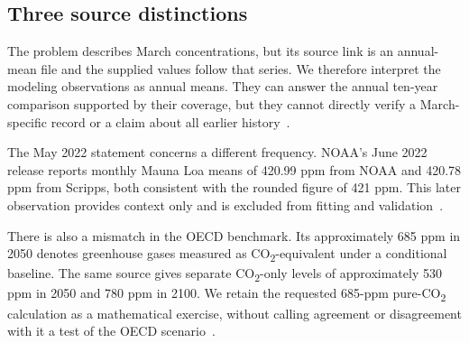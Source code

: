 \documentclass[11pt,a4paper]{article}
\newcommand{\p}[2]{#2\par}
\newcommand{\CO}{CO\textsubscript{2}}
\begin{document}
\subsection{Three source distinctions}
\p{DAT04}{The problem describes March concentrations, but its source link is an annual-mean file and the supplied values follow that series. We therefore interpret the modeling observations as annual means. They can answer the annual ten-year comparison supported by their coverage, but they cannot directly verify a March-specific record or a claim about all earlier history~\cite{problem,noaa-data}.}
\p{DAT05}{The May 2022 statement concerns a different frequency. NOAA's June 2022 release reports monthly Mauna Loa means of 420.99 ppm from NOAA and 420.78 ppm from Scripps, both consistent with the rounded figure of 421 ppm. This later observation provides context only and is excluded from fitting and validation~\cite{noaa-news}.}
\p{DAT06}{There is also a mismatch in the OECD benchmark. Its approximately 685 ppm in 2050 denotes greenhouse gases measured as \CO{}-equivalent under a conditional baseline. The same source gives separate \CO{}-only levels of approximately 530 ppm in 2050 and 780 ppm in 2100. We retain the requested 685-ppm pure-\CO{} calculation as a mathematical exercise, without calling agreement or disagreement with it a test of the OECD scenario~\cite{oecd}.}
\end{document}
